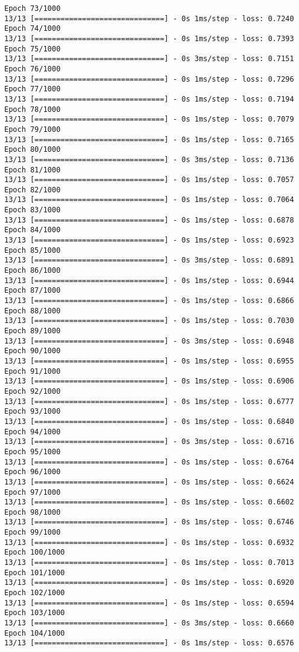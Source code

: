 \documentclass[11pt]{article}
\begin{document}
\begin{Verbatim}[commandchars=\\\{\}]
Epoch 73/1000
13/13 [==============================] - 0s 1ms/step - loss: 0.7240
Epoch 74/1000
13/13 [==============================] - 0s 1ms/step - loss: 0.7393
Epoch 75/1000
13/13 [==============================] - 0s 3ms/step - loss: 0.7151
Epoch 76/1000
13/13 [==============================] - 0s 1ms/step - loss: 0.7296
Epoch 77/1000
13/13 [==============================] - 0s 1ms/step - loss: 0.7194
Epoch 78/1000
13/13 [==============================] - 0s 1ms/step - loss: 0.7079
Epoch 79/1000
13/13 [==============================] - 0s 1ms/step - loss: 0.7165
Epoch 80/1000
13/13 [==============================] - 0s 3ms/step - loss: 0.7136
Epoch 81/1000
13/13 [==============================] - 0s 1ms/step - loss: 0.7057
Epoch 82/1000
13/13 [==============================] - 0s 1ms/step - loss: 0.7064
Epoch 83/1000
13/13 [==============================] - 0s 1ms/step - loss: 0.6878
Epoch 84/1000
13/13 [==============================] - 0s 1ms/step - loss: 0.6923
Epoch 85/1000
13/13 [==============================] - 0s 3ms/step - loss: 0.6891
Epoch 86/1000
13/13 [==============================] - 0s 1ms/step - loss: 0.6944
Epoch 87/1000
13/13 [==============================] - 0s 1ms/step - loss: 0.6866
Epoch 88/1000
13/13 [==============================] - 0s 1ms/step - loss: 0.7030
Epoch 89/1000
13/13 [==============================] - 0s 3ms/step - loss: 0.6948
Epoch 90/1000
13/13 [==============================] - 0s 1ms/step - loss: 0.6955
Epoch 91/1000
13/13 [==============================] - 0s 1ms/step - loss: 0.6906
Epoch 92/1000
13/13 [==============================] - 0s 1ms/step - loss: 0.6777
Epoch 93/1000
13/13 [==============================] - 0s 1ms/step - loss: 0.6840
Epoch 94/1000
13/13 [==============================] - 0s 3ms/step - loss: 0.6716
Epoch 95/1000
13/13 [==============================] - 0s 1ms/step - loss: 0.6764
Epoch 96/1000
13/13 [==============================] - 0s 1ms/step - loss: 0.6624
Epoch 97/1000
13/13 [==============================] - 0s 1ms/step - loss: 0.6602
Epoch 98/1000
13/13 [==============================] - 0s 1ms/step - loss: 0.6746
Epoch 99/1000
13/13 [==============================] - 0s 1ms/step - loss: 0.6932
Epoch 100/1000
13/13 [==============================] - 0s 1ms/step - loss: 0.7013
Epoch 101/1000
13/13 [==============================] - 0s 1ms/step - loss: 0.6920
Epoch 102/1000
13/13 [==============================] - 0s 1ms/step - loss: 0.6594
Epoch 103/1000
13/13 [==============================] - 0s 3ms/step - loss: 0.6660
Epoch 104/1000
13/13 [==============================] - 0s 1ms/step - loss: 0.6576

\end{Verbatim}
\end{document}
